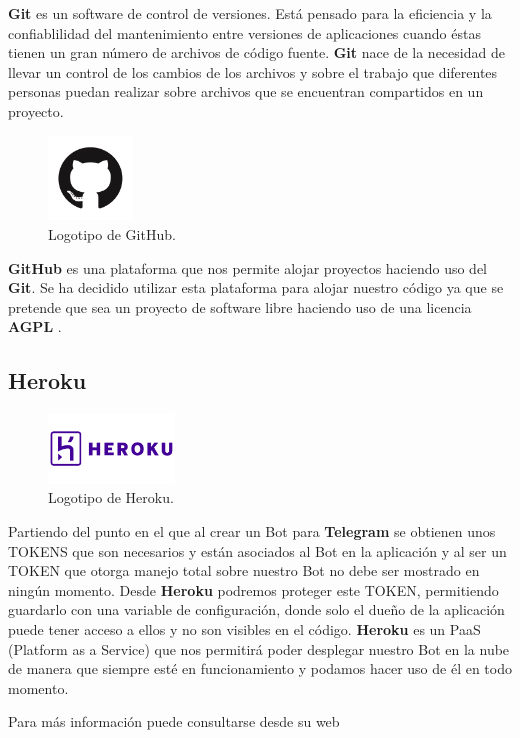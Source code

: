 \textbf{Git} es un software de control de versiones. Está pensado para la eficiencia y la confiablilidad del mantenimiento entre versiones de aplicaciones cuando éstas tienen un gran número de archivos de código fuente. \textbf{Git} nace de la necesidad de llevar un control de los cambios de los archivos y sobre el trabajo que diferentes personas puedan realizar sobre archivos que se encuentran compartidos en un proyecto.

\begin{figure}[H]
	\centering
	\includegraphics[width=0.2\textwidth]{img/github-icon}
	\caption{Logotipo de GitHub.}
\end{figure}

\textbf{GitHub} es una plataforma que nos permite alojar proyectos haciendo uso del \textbf{Git}. Se ha decidido utilizar esta plataforma para alojar nuestro código ya que se pretende que sea un proyecto de software libre haciendo uso de una licencia \textbf{AGPL} \cite{agplv3}.

\subsection{Heroku}

\begin{figure}[H]
	\centering
	\includegraphics[width=0.3\textwidth]{img/heroku-icon}
	\caption{Logotipo de Heroku.}
\end{figure}

Partiendo del punto en el que al crear un Bot para \textbf{Telegram} se obtienen unos TOKENS que son necesarios y están asociados al Bot en la aplicación y al ser un TOKEN que otorga manejo total sobre nuestro Bot no debe ser mostrado en ningún momento. Desde \textbf{Heroku} podremos proteger este TOKEN, permitiendo guardarlo con una variable de configuración, donde solo el dueño de la aplicación puede tener acceso a ellos y no son visibles en el código. \textbf{Heroku} es un PaaS (Platform as a Service) que nos permitirá poder desplegar nuestro Bot en la nube de manera que siempre esté en funcionamiento y podamos hacer uso de él en todo momento.

Para más información puede consultarse desde su web \cite{heroku}